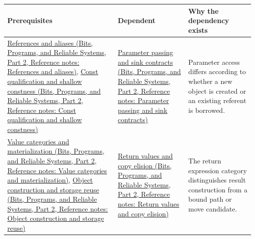 {\def\LTcaptype{none} %
\begin{longtable}[]{@{}
  >{\raggedright\arraybackslash}p{}
  >{\raggedright\arraybackslash}p{}
  >{\raggedright\arraybackslash}p{}@{}}
\toprule\noalign{}
\begin{minipage}[b]{\linewidth}\raggedright
Prerequisites
\end{minipage} & \begin{minipage}[b]{\linewidth}\raggedright
Dependent
\end{minipage} & \begin{minipage}[b]{\linewidth}\raggedright
Why the dependency exists
\end{minipage} \\
\midrule\noalign{}
\endhead
\bottomrule\noalign{}
\endlastfoot
\href{../01-Bits-Programs-and-Reliable-Systems-P02/main.pdf\#nameddest=appendix-d6d562ca9fbb}{References and aliases (Bits, Programs, and Reliable Systems, Part 2, Reference notes: References and aliases)}, \href{../01-Bits-Programs-and-Reliable-Systems-P02/main.pdf\#nameddest=appendix-c25d60fed375}{Const qualification and shallow constness (Bits, Programs, and Reliable Systems, Part 2, Reference notes: Const qualification and shallow constness)} & \href{../01-Bits-Programs-and-Reliable-Systems-P02/main.pdf\#nameddest=appendix-d5908f75721f}{Parameter passing and sink contracts (Bits, Programs, and Reliable Systems, Part 2, Reference notes: Parameter passing and sink contracts)} & Parameter access differs according to whether a new object is created or an existing referent is borrowed. \\
\href{../01-Bits-Programs-and-Reliable-Systems-P02/main.pdf\#nameddest=appendix-1121b30eaeb0}{Value categories and materialization (Bits, Programs, and Reliable Systems, Part 2, Reference notes: Value categories and materialization)}, \href{../01-Bits-Programs-and-Reliable-Systems-P02/main.pdf\#nameddest=appendix-a82f9c438857}{Object construction and storage reuse (Bits, Programs, and Reliable Systems, Part 2, Reference notes: Object construction and storage reuse)} & \href{../01-Bits-Programs-and-Reliable-Systems-P02/main.pdf\#nameddest=appendix-b08d3788c5c6}{Return values and copy elision (Bits, Programs, and Reliable Systems, Part 2, Reference notes: Return values and copy elision)} & The return expression category distinguishes result construction from a bound path or move candidate. \\

\end{longtable}}
